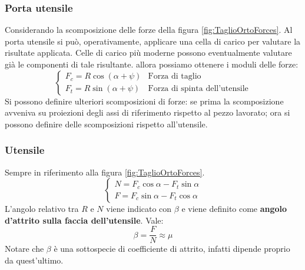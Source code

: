 \subsubsection*{Porta utensile}
Considerando la scomposizione delle forze della figura \ref{fig:TaglioOrtoForces}.
Al porta utensile si può, operativamente, applicare una cella di carico per 
valutare la risultate applicata. Celle di carico più moderne possono eventualmente
valutare già le componenti di tale risultante.
allora possiamo ottenere i moduli delle forze:
\begin{equation}
\begin{cases}
F_c = R \cos(\alpha + \psi) &\text{Forza di taglio}\\
F_t = R \sin(\alpha + \psi) &\text{Forza di spinta dell'utensile}
\end{cases}
\end{equation}
Si possono definire ulteriori scomposizioni di forze: se prima la scomposizione
avveniva su proiezioni degli assi di riferimento rispetto al pezzo lavorato; ora si 
possono definire delle scomposizioni rispetto all'utensile.

\subsubsection*{Utensile}
Sempre in riferimento alla figura \ref{fig:TaglioOrtoForces}.
\begin{equation}
\begin{cases}
N = F_c \cos\alpha - F_t\sin\alpha\\
F = F_c \sin\alpha - F_t\cos\alpha
\end{cases}
\end{equation}
L'angolo relativo tra $R$ e $N$ viene indicato con $\beta$ e viene definito come 
\textbf{angolo d'attrito sulla faccia dell'utensile}. Vale:
\begin{equation}
\beta = \frac{F}{N} \approx \mu
\label{eqn:AngAttrito}
\end{equation}
Notare che $\beta$ è una sottospecie di coefficiente di attrito, infatti dipende
proprio da quest'ultimo.

